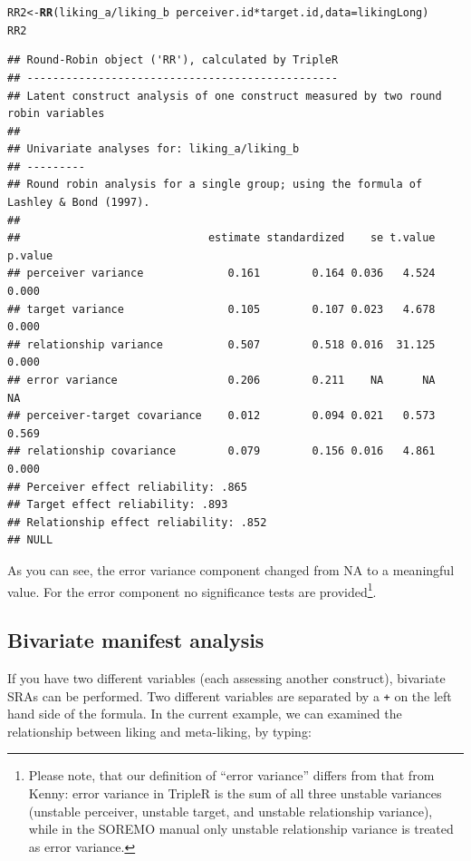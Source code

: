 \documentclass[a4paper]{article}\usepackage[]{graphicx}\usepackage[]{color}
\makeatletter
\newcommand{\hlopt}[1]{\textcolor[rgb]{0,0,0}{#1}}%
\newcommand{\hlstd}[1]{\textcolor[rgb]{0.345,0.345,0.345}{#1}}%
\newcommand{\hlkwb}[1]{\textcolor[rgb]{0.69,0.353,0.396}{#1}}%
\newcommand{\hlkwc}[1]{\textcolor[rgb]{0.333,0.667,0.333}{#1}}%
\newcommand{\hlkwd}[1]{\textcolor[rgb]{0.737,0.353,0.396}{\textbf{#1}}}%
\newenvironment{kframe}{%
 \def\at@end@of@kframe{}%
 \ifinner\ifhmode%
  \def\at@end@of@kframe{\end{minipage}}%
  \begin{minipage}{\columnwidth}%
 \fi\fi%
 \def\FrameCommand##1{\hskip\@totalleftmargin \hskip-\fboxsep
 \colorbox{shadecolor}{##1}\hskip-\fboxsep
     \hskip-\linewidth \hskip-\@totalleftmargin \hskip\columnwidth}%
 \MakeFramed {\advance\hsize-\width
   \@totalleftmargin\z@ \linewidth\hsize
   \@setminipage}}%
 {\par\unskip\endMakeFramed%
 \at@end@of@kframe}
\newenvironment{knitrout}{}{} %
\makeatother
\begin{document}
\begin{knitrout}\small
{}\color{fgcolor}\begin{kframe}
\begin{alltt}
\hlstd{RR2} \hlkwb{<-} \hlkwd{RR}\hlstd{(liking_a}\hlopt{/}\hlstd{liking_b} \hlopt{~} \hlstd{perceiver.id} \hlopt{*} \hlstd{target.id,} \hlkwc{data} \hlstd{= likingLong)}
\hlstd{RR2}
\end{alltt}
\begin{verbatim}
## Round-Robin object ('RR'), calculated by TripleR
## ------------------------------------------------
## Latent construct analysis of one construct measured by two round robin variables
## 
## Univariate analyses for: liking_a/liking_b 
## ---------
## Round robin analysis for a single group; using the formula of Lashley & Bond (1997).
## 
##                             estimate standardized    se t.value p.value
## perceiver variance             0.161        0.164 0.036   4.524   0.000
## target variance                0.105        0.107 0.023   4.678   0.000
## relationship variance          0.507        0.518 0.016  31.125   0.000
## error variance                 0.206        0.211    NA      NA      NA
## perceiver-target covariance    0.012        0.094 0.021   0.573   0.569
## relationship covariance        0.079        0.156 0.016   4.861   0.000
## Perceiver effect reliability: .865 
## Target effect reliability: .893 
## Relationship effect reliability: .852 
## NULL
\end{verbatim}
\end{kframe}
\end{knitrout}

As you can see, the error variance component changed from NA to a meaningful value. For the error component no significance tests are provided\footnote{Please note, that our definition of ``error variance'' differs from that from Kenny: error variance in TripleR is the sum of all three unstable variances (unstable perceiver, unstable target, and unstable relationship variance), while in the SOREMO manual only unstable relationship variance is treated as error variance.}.




\subsection{Bivariate manifest analysis} %
\label{sub:bivariate_manifest_analysis}
If you have two different variables (each assessing another construct), bivariate SRAs can be performed. Two different variables are separated by a \texttt{+} on the left hand side of the formula. In the current example, we can examined the relationship between liking and meta-liking, by typing:
\end{document}
